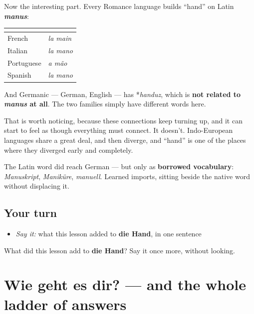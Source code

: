 \begin{culture}
Now the interesting part. Every Romance language builds \textquotedblleft{}hand\textquotedblright{} on Latin \emph{\textbf{manus}}:

\noindent
\begin{tabularx}{\linewidth}{@{}>{\raggedright\arraybackslash}X>{\raggedright\arraybackslash}X@{}}
\toprule
\textbf{} & \textbf{} \\
\midrule
French & \emph{la main} \\
Italian & \emph{la mano} \\
Portuguese & \emph{a mão} \\
Spanish & \emph{la mano} \\
\bottomrule
\end{tabularx}

And Germanic — German, English — has *\emph{handuz}, which is \textbf{not related to \emph{manus} at all}. The two families simply have different words here.

That is worth noticing, because these connections keep turning up, and it can start to feel as though everything must connect. It doesn't. Indo-European languages share a great deal, and then diverge, and \textquotedblleft{}hand\textquotedblright{} is one of the places where they diverged early and completely.

The Latin word did reach German — but only as \textbf{borrowed vocabulary}: \emph{Manuskript}, \emph{Maniküre}, \emph{manuell}. Learned imports, sitting beside the native word without displacing it.
\end{culture}

\subsection*{Your turn}
\begin{itemize}
\raggedright
  \item \emph{Say it:} what this lesson added to \textbf{die Hand}, in one sentence
\end{itemize}

\begin{tcolorbox}[breakable,colback=teal!4,colframe=teal!35!black,title={Before you move on}]
What did this lesson add to \textbf{die Hand}? Say it once more, without looking.
\end{tcolorbox}
\section[Practice]{Wie geht es dir? — and the whole ladder of answers}

